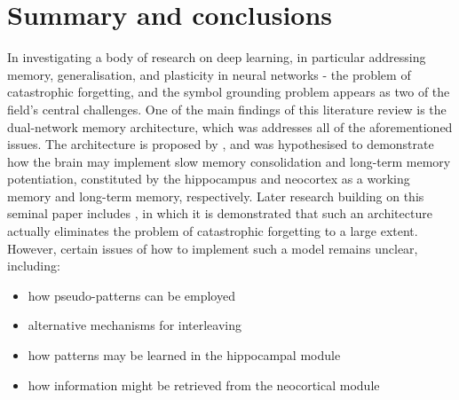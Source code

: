 \section{Summary and conclusions}

In investigating a body of research on deep learning, in particular addressing memory, generalisation, and plasticity in neural networks - the problem of catastrophic forgetting, and the symbol grounding problem appears as two of the field's central challenges. One of the main findings of this literature review is the dual-network memory architecture, which was addresses all of the aforementioned issues. The architecture is proposed by \cite{McClelland1995}, and was hypothesised to demonstrate how the brain may implement slow memory consolidation and long-term memory potentiation, constituted by the hippocampus and neocortex as a working memory and long-term memory, respectively. Later research building on this seminal paper includes \cite{French1997, Ans1997, Ans2000, French2001, Hattori2010, Hattori2014}, in which it is demonstrated that such an architecture actually eliminates the problem of catastrophic forgetting to a large extent. However, certain issues of how to implement such a model remains unclear, including:
\begin{itemize}
\item how pseudo-patterns can be employed
\item alternative mechanisms for interleaving
\item how patterns may be learned in the hippocampal module
\item how information might be retrieved from the neocortical module
\end{itemize}
